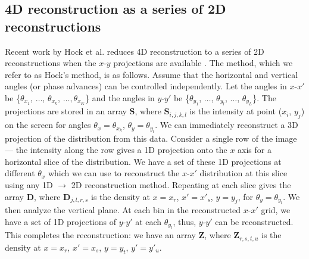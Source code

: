 \subsection{4D reconstruction as a series of 2D reconstructions}

Recent work by Hock et al. reduces 4D reconstruction to a series of 2D reconstructions when the $x$-$y$ projections are available \cite{Hock2013a}. The method, which we refer to as Hock's method, is as follows. Assume that the horizontal and vertical angles (or phase advances) can be controlled independently. Let the angles in $x$-$x'$ be \{$\theta_{x_1}$, $\dots$, $\theta_{x_k}$, $\dots, \theta_{x_K}$\} and the angles in $y$-$y'$ be \{$\theta_{y_1}$, $\dots$, $\theta_{y_l}$, $\dots$, $\theta_{y_L}$\}. The projections are stored in an array $\mathbf{S}$, where $\mathbf{S}_{i,j,k,l}$ is the intensity at point ($x_i$, $y_j$) on the screen for angles $\theta_x = \theta_{x_k}$, $\theta_y = \theta_{y_l}$. We can immediately reconstruct a 3D projection of the distribution from this data. Consider a single row of the image — the intensity along the row gives a 1D projection onto the $x$ axis for a horizontal slice of the distribution. We have a set of these 1D projections at different $\theta_{x}$ which we can use to reconstruct the $x$-$x'$ distribution at this slice using any 1D $\rightarrow$ 2D reconstruction method. Repeating at each slice gives the array $\mathbf{D}$, where $\mathbf{D}_{j, l, r, s}$ is the density at $x = x_r$, $x' = x'_s$, $y = y_j$, for $\theta_{y} = \theta_{y_l}$. We then analyze the vertical plane. At each bin in the reconstructed $x$-$x'$ grid, we have a set of 1D projections of $y$-$y'$ at each $\theta_{y_l}$, thus, $y$-$y'$ can be reconstructed. This completes the reconstruction: we have an array $\mathbf{Z}$, where $\mathbf{Z}_{r, s, t, u}$ is the density at $x = x_r$, $x' = x_s$, $y = y_t$, $y' = y'_u$.

